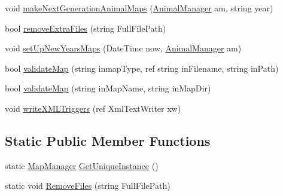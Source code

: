\begin{DoxyCompactItemize}
\item 
void \hyperlink{class_p_a_z___dispersal_1_1_map_manager_a9aecf9bb85d1cc78c3e5eb41f0ab2eaf}{make\-Next\-Generation\-Animal\-Maps} (\hyperlink{class_p_a_z___dispersal_1_1_animal_manager}{Animal\-Manager} am, string year)
\item 
bool \hyperlink{class_p_a_z___dispersal_1_1_map_manager_a734ad95eae6ebc0f1666bd69a09d050a}{remove\-Extra\-Files} (string Full\-File\-Path)
\item 
void \hyperlink{class_p_a_z___dispersal_1_1_map_manager_adbc7ab1d1cf427c4108ce567cc24d6da}{set\-Up\-New\-Years\-Maps} (Date\-Time now, \hyperlink{class_p_a_z___dispersal_1_1_animal_manager}{Animal\-Manager} am)
\item 
bool \hyperlink{class_p_a_z___dispersal_1_1_map_manager_abeaf45083c035ffcab521e616441d10e}{validate\-Map} (string inmap\-Type, ref string in\-Filename, string in\-Path)
\item 
bool \hyperlink{class_p_a_z___dispersal_1_1_map_manager_a6afb5324e3b2161559ff268f22b17876}{validate\-Map} (string in\-Map\-Name, string in\-Map\-Dir)
\item 
void \hyperlink{class_p_a_z___dispersal_1_1_map_manager_ab74efd03a52403e80f7e2cca935d8b25}{write\-X\-M\-L\-Triggers} (ref Xml\-Text\-Writer xw)
\end{DoxyCompactItemize}
\subsection*{Static Public Member Functions}
\begin{DoxyCompactItemize}
\item 
static \hyperlink{class_p_a_z___dispersal_1_1_map_manager}{Map\-Manager} \hyperlink{class_p_a_z___dispersal_1_1_map_manager_a59b8b0b823db0809b7184914d915f05b}{Get\-Unique\-Instance} ()
\item 
static void \hyperlink{class_p_a_z___dispersal_1_1_map_manager_ae50db13380cd6ff252f98e211e7ee1f6}{Remove\-Files} (string Full\-File\-Path)
\end{DoxyCompactItemize}

